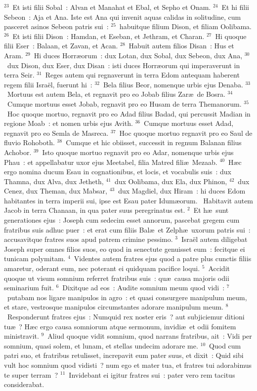 ${}^{23}$~Et isti filii Sobal~: Alvan et Manahat et Ebal, et Sepho et Onam.
${}^{24}$~Et hi filii Sebeon~: Aja et Ana. Iste est Ana qui invenit aquas calidas in solitudine, cum pasceret asinos Sebeon patris sui~:
${}^{25}$~habuitque filium Dison, et filiam Oolibama.
${}^{26}$~Et isti filii Dison~: Hamdan, et Eseban, et Jethram, et Charan.
${}^{27}$~Hi quoque filii Eser~: Balaan, et Zavan, et Acan.
${}^{28}$~Habuit autem filios Disan~: Hus et Aram.
${}^{29}$~Hi duces Horr\ae orum~: dux Lotan, dux Sobal, dux Sebeon, dux Ana,
${}^{30}$~dux Dison, dux Eser, dux Disan~: isti duces Horr\ae orum qui imperaverunt in terra Seir.
${}^{31}$~Reges autem qui regnaverunt in terra Edom antequam haberent regem filii Isra\"el, fuerunt hi~:
${}^{32}$~Bela filius Beor, nomenque urbis ejus Denaba.
${}^{33}$~Mortuus est autem Bela, et regnavit pro eo Jobab filius Zar\ae\ de Bosra.
${}^{34}$~Cumque mortuus esset Jobab, regnavit pro eo Husam de terra Themanorum.
${}^{35}$~Hoc quoque mortuo, regnavit pro eo Adad filius Badad, qui percussit Madian in regione Moab~: et nomen urbis ejus Avith.
${}^{36}$~Cumque mortuus esset Adad, regnavit pro eo Semla de Masreca.
${}^{37}$~Hoc quoque mortuo regnavit pro eo Saul de fluvio Rohoboth.
${}^{38}$~Cumque et hic obiisset, successit in regnum Balanan filius Achobor.
${}^{39}$~Isto quoque mortuo regnavit pro eo Adar, nomenque urbis ejus Phau~: et appellabatur uxor ejus Meetabel, filia Matred fili\ae\ Mezaab.
${}^{40}$~H\ae c ergo nomina ducum Esau in cognationibus, et locis, et vocabulis suis~: dux Thamna, dux Alva, dux Jetheth,
${}^{41}$~dux Oolibama, dux Ela, dux Phinon,
${}^{42}$~dux Cenez, dux Theman, dux Mabsar,
${}^{43}$~dux Magdiel, dux Hiram~: hi duces Edom habitantes in terra imperii sui, ipse est Esau pater Idum\ae orum.
~Habitavit autem Jacob in terra Chanaan, in qua pater suus peregrinatus est.
${}^{2}$~Et h\ae\ sunt generationes ejus~: Joseph cum sedecim esset annorum, pascebat gregem cum fratribus suis adhuc puer~: et erat cum filiis Bal\ae\ et Zelph\ae\ uxorum patris sui~: accusavitque fratres suos apud patrem crimine pessimo.
${}^{3}$~Isra\"el autem diligebat Joseph super omnes filios suos, eo quod in senectute genuisset eum~: fecitque ei tunicam polymitam.
${}^{4}$~Videntes autem fratres ejus quod a patre plus cunctis filiis amaretur, oderant eum, nec poterant ei quidquam pacifice loqui.
${}^{5}$~Accidit quoque ut visum somnium referret fratribus suis~: qu\ae\ causa majoris odii seminarium fuit.
${}^{6}$~Dixitque ad eos~: Audite somnium meum quod vidi~:
${}^{7}$~putabam nos ligare manipulos in agro~: et quasi consurgere manipulum meum, et stare, vestrosque manipulos circumstantes adorare manipulum meum.
${}^{8}$~Responderunt fratres ejus~: Numquid rex noster eris~? aut subjiciemur ditioni tu\ae~? H\ae c ergo causa somniorum atque sermonum, invidi\ae\ et odii fomitem ministravit.
${}^{9}$~Aliud quoque vidit somnium, quod narrans fratribus, ait~: Vidi per somnium, quasi solem, et lunam, et stellas undecim adorare me.
${}^{10}$~Quod cum patri suo, et fratribus retulisset, increpavit eum pater suus, et dixit~: Quid sibi vult hoc somnium quod vidisti~? num ego et mater tua, et fratres tui adorabimus te super terram~?
${}^{11}$~Invidebant ei igitur fratres sui~: pater vero rem tacitus considerabat.


